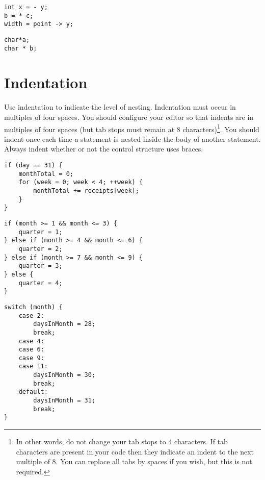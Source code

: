 \documentclass{article}
\begin{document}
\begin{multicols}{2}
\begin{lstlisting}
int x = - y;
b = * c;
width = point -> y;
\end{lstlisting}

\begin{lstlisting}
char*a;
char * b;
\end{lstlisting}

\end{multicols}

\section{Indentation}
Use indentation to indicate the level of nesting.
Indentation must occur in multiples of four spaces.
You should configure your editor so that indents are in multiples of four spaces (but tab stops must remain at 8 characters)\footnote{In other words, do not change your tab stops to 4 characters. If tab characters are 
present in your code then they indicate an indent to the next multiple of 8. You can replace all tabs by spaces
if you wish, but this is not required.}.
You should indent once each time a statement is nested inside the body of another statement.
Always indent whether or not the control structure uses braces.

\begin{lstlisting}
if (day == 31) {
    monthTotal = 0;
    for (week = 0; week < 4; ++week) {
        monthTotal += receipts[week];
    }
}
\end{lstlisting}

\begin{lstlisting}
if (month >= 1 && month <= 3) {
    quarter = 1;
} else if (month >= 4 && month <= 6) {
    quarter = 2;
} else if (month >= 7 && month <= 9) {
    quarter = 3;
} else {
    quarter = 4;
}
\end{lstlisting}
\clearpage
{}
\begin{lstlisting}
switch (month) {
    case 2:
        daysInMonth = 28;
        break;
    case 4:
    case 6:
    case 9:
    case 11:
        daysInMonth = 30;
        break;
    default:
        daysInMonth = 31;
        break;
}
\end{lstlisting}
\end{document}
